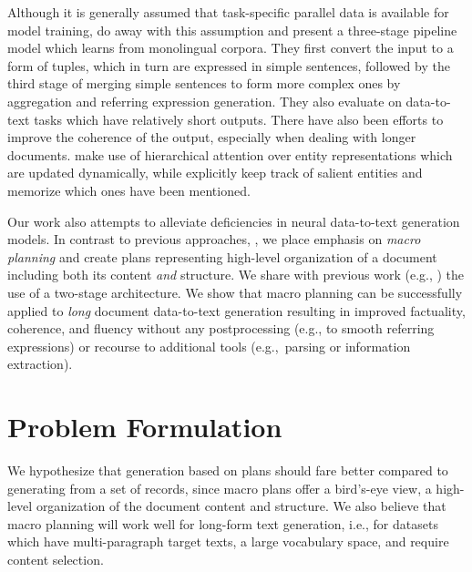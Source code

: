 \documentclass[11pt,a4paper]{article}
\begin{document}
Although it is generally assumed that task-specific parallel data is
available for model training,
\citet{doi:10.1162/colia00363} do away with this assumption
and present a three-stage pipeline model which learns from monolingual
corpora. They first convert the input to a form of tuples, which in
turn are expressed in simple sentences, followed by the third stage of
merging simple sentences to form more complex ones by aggregation and
referring expression generation. They also evaluate on data-to-text
tasks which have relatively short outputs.  There have also been
efforts to improve the coherence of the output, especially when
dealing with longer documents.  \citet{puduppully-etal-2019-data} make
use of hierarchical attention over entity representations which are
updated dynamically, while \citet{iso-etal-2019-learning} explicitly
keep track of salient entities and memorize which ones have been
mentioned.

Our work also attempts to alleviate deficiencies in neural
data-to-text generation models. In contrast to previous approaches,
\cite{DBLP:journals/corr/abs-1809-00582,moryossef-etal-2019-step,doi:10.1162/colia00363},
we place emphasis on \emph{macro planning} and create plans
representing high-level organization of a document including both its
content \emph{and} structure. We share with previous work (e.g.,
\citealt{moryossef-etal-2019-step}) the use of a two-stage architecture.
We show that macro planning can be
successfully applied to \emph{long} document data-to-text generation
resulting in improved factuality, coherence, and fluency without any
postprocessing (e.g., to smooth referring expressions) or recourse to
additional tools (e.g.,~parsing or information extraction).





\section{Problem Formulation}


We hypothesize that generation based on plans should fare better
compared to generating from a set of records, since macro plans offer
a bird's-eye view, a high-level organization of the document content
and structure.  We also believe that macro planning will work well for long-form text
generation, i.e., for datasets which have multi-paragraph target
texts, a large vocabulary space, and require content selection.
\end{document}
